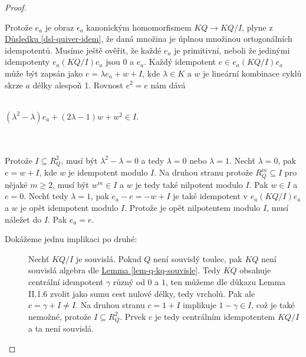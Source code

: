     \begin{proof}
      \begin{description}
        \item 
        \item[(a)]
          Protože $e_a$ je obraz $\epsilon_a$ kanonickým homomorfismem $KQ\to 
          KQ/I$, plyne z \hyperref[dsl-quiver-idem]{Důsledku 
          \ref*{dsl-quiver-idem}}, že daná množina je úplnou množinou 
          ortogonálních idempotentů. Musíme ještě ověřit, že každé $e_a$ je 
          primitivní, neboli že jedinými idempotenty $e_a(KQ/I)e_a$ jsou 0 a 
          $e_a$. Každý idempotent $e\in e_a(KQ/I)e_a$ může být zapsán jako $e=\lambda 
          e_a+w+I$, kde $\lambda\in K$ a $w$ je lineární kombinace cyklů skrze $a$ 
          délky alespoň 1. Rovnost $e^2=e$ nám dává \\\\
          \centerline{$(\lambda^2-\lambda)e_a+(2\lambda-1)w+w^2\in I$.} \\\\
          Protože $I\subseteq R^2_Q$, musí být 
          $\lambda^2-\lambda=0$ a tedy $\lambda=0$ nebo $\lambda=1$. 
          Nechť $\lambda=0$, pak $e=w+I$, kde $w$ je idempotent modulo $I$. 
          Na druhou stranu protože $R^m_Q\subseteq I$ pro nějaké $m\geq 2$, musí 
          být $w^m\in I$ a $w$ je tedy také nilpotent modulo $I$. Pak $w\in I$ a $e=0$.
          Nechť tedy $\lambda=1$, pak $e_a-e=-w+I$ je také idempotent v $e_a(KQ/I)e_a$ 
          a $w$ je opět idempotent modulo $I$. Protože je opět nilpotentem 
          modulo $I$, musí náležet do $I$. Pak $e_a=e$.
          
        \item[(b)] Dokážeme jednu implikaci po druhé:
          \begin{description}
            \item[\Rightarrow] Nechť $KQ/I$ je souvislá. 
              Pokud $Q$ není souvislý toulec, pak $KQ$ není 
              souvislá algebra dle \hyperref[lem-q-kq-souvisle]{Lemma 
              \ref*{lem-q-kq-souvisle}}. Tedy $KQ$ obsahuje centrální idempotent 
              $\gamma$ různý od $0$ a $1$, ten můžeme dle důkazu \cite{1} Lemma II.1.6 zvolit jako 
              sumu cest nulové délky, tedy vrcholů. Pak ale $c=\gamma+I\neq I$. 
              Na druhou stranu $c=1+I$ implikuje $1-\gamma\in I$, což je také 
              nemožné, protože $I\subseteq R^2_Q$. Prvek $c$ je tedy centrálním 
              idempotentem $KQ/I$ a ta není souvislá.
            

\end{description}
\end{description}
\end{proof}
